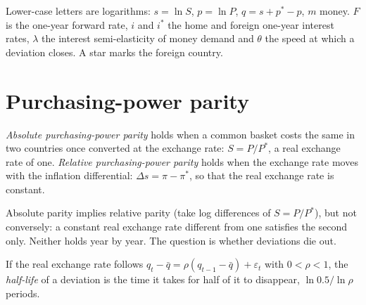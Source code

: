\begin{notation}\label{not:b3:exchange-rates:symbols}
Lower-case letters are logarithms: $s = \ln S$, $p = \ln P$, $q = s + p^* - p$, $m$ money.
$F$ is the one-year forward rate, $i$ and $i^*$ the home and foreign one-year interest
rates, $\lambda$ the interest semi-elasticity of money demand and $\theta$ the speed at
which a deviation closes. A star marks the foreign country.
\end{notation}

\section{Purchasing-power parity}\label{sec:b3:exchange-rates:ppp}

\begin{definition}\label{def:b3:exchange-rates:ppp}
\emph{Absolute purchasing-power parity} holds when a common basket costs the same in
two countries once converted at the exchange rate: $S = P/P^*$, a real exchange rate
of one. \emph{Relative purchasing-power parity} holds when the exchange rate moves
with the inflation differential: $\Delta s = \pi - \pi^*$, so that the real exchange rate is
constant.
\end{definition}

Absolute parity implies relative parity (take log differences of $S = P/P^*$), but
not conversely: a constant real exchange rate different from one satisfies the
second only. Neither holds year by year. The question is whether deviations die
out.

\begin{definition}\label{def:b3:exchange-rates:half-life}
If the real exchange rate follows $q_t - \bar q = \rho(q_{t-1} - \bar q) + \varepsilon_t$ with $0 < \rho < 1$, the
\emph{half-life} of a deviation is the time it takes for half of it to disappear,
$\ln 0.5/\ln \rho$ periods.
\end{definition}

